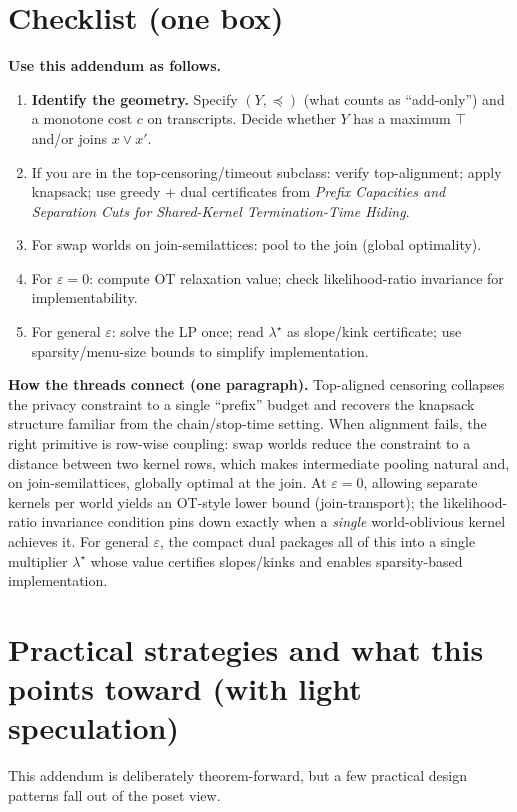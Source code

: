 \documentclass[11pt]{article}
\theoremstyle{definition}
\theoremstyle{remark}
\begin{document}
\section*{Checklist (one box)}
\begin{framed}
\noindent\textbf{Use this addendum as follows.}
\begin{enumerate}[leftmargin=*]
\item \textbf{Identify the geometry.} Specify $(Y,\preceq)$ (what counts as ``add-only'') and a monotone cost $c$ on transcripts. Decide whether $Y$ has a maximum $\top$ and/or joins $x\vee x'$.
\item If you are in the top-censoring/timeout subclass: verify top-alignment; apply knapsack; use greedy + dual certificates from \emph{Prefix Capacities and Separation Cuts for Shared-Kernel Termination-Time Hiding}.
\item For swap worlds on join-semilattices: pool to the join (global optimality).
\item For $\varepsilon=0$: compute OT relaxation value; check likelihood-ratio invariance for implementability.
\item For general $\varepsilon$: solve the LP once; read $\lambda^\star$ as slope/kink certificate; use sparsity/menu-size bounds to simplify implementation.
\end{enumerate}
\end{framed}
\vspace{0.25em}\noindent
\textbf{How the threads connect (one paragraph).}
Top-aligned censoring collapses the privacy constraint to a single ``prefix'' budget and recovers the knapsack structure familiar from the chain/stop-time setting.
When alignment fails, the right primitive is row-wise coupling: swap worlds reduce the constraint to a distance between two kernel rows, which makes intermediate pooling natural and, on join-semilattices, globally optimal at the join.
At $\varepsilon=0$, allowing separate kernels per world yields an OT-style lower bound (join-transport); the likelihood-ratio invariance condition pins down exactly when a \emph{single} world-oblivious kernel achieves it.
For general $\varepsilon$, the compact dual packages all of this into a single multiplier $\lambda^\star$ whose value certifies slopes/kinks and enables sparsity-based implementation.




\section[Practical strategies]{Practical strategies and what this points toward (with light speculation)}
\noindent
This addendum is deliberately theorem-forward, but a few practical design patterns fall out of the poset view.
\end{document}
